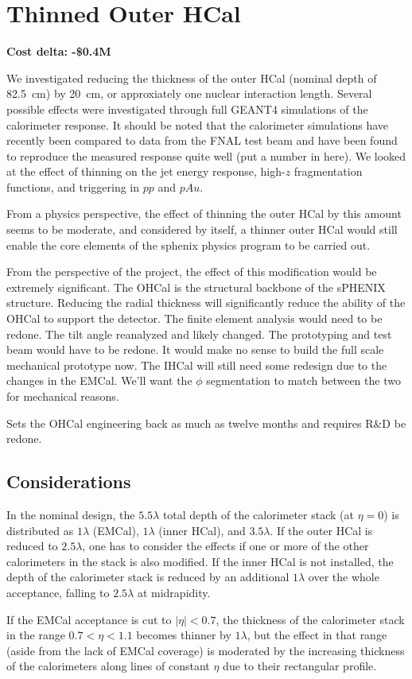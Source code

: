 \section*{Thinned Outer HCal}
\label{ohcal_thin}

\textbf{Cost delta: -\$0.4M}

We investigated reducing the thickness of the outer HCal (nominal
depth of 82.5~cm) by 20~cm, or approxiately one nuclear interaction
length.  Several possible effects were investigated through full
\textsc{GEANT4} simulations of the calorimeter response.  It should be
noted that the calorimeter simulations have recently been compared to
data from the FNAL test beam and have been found to reproduce the
measured response quite well (put a number in here).  We looked at the
effect of thinning on the jet energy response, high-$z$ fragmentation
functions, and triggering in $pp$ and $pAu$.

From a physics perspective, the effect of thinning the outer HCal by
this amount seems to be moderate, and considered by itself, a thinner
outer HCal would still enable the core elements of the sphenix physics
program to be carried out.

From the perspective of the project, the effect of this modification
would be extremely significant.  The OHCal is the structural backbone
of the sPHENIX structure.  Reducing the radial thickness will
significantly reduce the ability of the OHCal to support the detector.
The finite element analysis would need to be redone. The tilt angle
reanalyzed and likely changed. The prototyping and test beam would
have to be redone.  It would make no sense to build the full scale
mechanical prototype now.  The IHCal will still need some redesign due
to the changes in the EMCal. We’ll want the $\phi$ segmentation to
match between the two for mechanical reasons.

Sets the OHCal engineering back as much as twelve months and requires
R\&D be redone.

\subsection*{Considerations}

In the nominal design, the $5.5 \lambda$ total depth of the
calorimeter stack (at $\eta = 0$) is distributed as $1 \lambda$
(EMCal), $1 \lambda$ (inner HCal), and $3.5 \lambda$.  If the outer
HCal is reduced to $2.5 \lambda$, one has to consider the effects if
one or more of the other calorimeters in the stack is also modified.
If the inner HCal is not installed, the depth of the calorimeter stack
is reduced by an additional $1 \lambda$ over the whole acceptance,
falling to $2.5 \lambda$ at midrapidity.

If the EMCal acceptance is cut to $|\eta| < 0.7$, the thickness of the
calorimeter stack in the range $0.7 < \eta < 1.1$ becomes thinner by
$1 \lambda$, but the effect in that range (aside from the lack of
EMCal coverage) is moderated by the increasing thickness of the
calorimeters along lines of constant $\eta$ due to their rectangular
profile.


